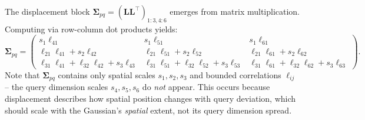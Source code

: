 \documentclass{article}
\theoremstyle{plain}
\theoremstyle{definition}
\theoremstyle{remark}
\begin{document}

The displacement block $\boldsymbol{\Sigma}_{pq} = (\mathbf{L}\mathbf{L}^\top)_{1:3,4:6}$ emerges from matrix multiplication. Computing via row-column dot products yields:
\begin{equation}
\boldsymbol{\Sigma}_{pq} = \left(\begin{array}{rrr}
                           s_1 \ell_{41} &                            s_1 \ell_{51} &                            s_1 \ell_{61} \\
     \ell_{21}\ell_{41} + s_2 \ell_{42} &      \ell_{21}\ell_{51} + s_2 \ell_{52} &      \ell_{21}\ell_{61} + s_2 \ell_{62} \\
\ell_{31}\ell_{41} + \ell_{32}\ell_{42} + s_3 \ell_{43} & \ell_{31}\ell_{51} + \ell_{32}\ell_{52} + s_3 \ell_{53} & \ell_{31}\ell_{61} + \ell_{32}\ell_{62} + s_3 \ell_{63}
\end{array}\right).
\end{equation}
Note that $\boldsymbol{\Sigma}_{pq}$ contains only spatial scales $s_1, s_2, s_3$ and bounded correlations $\ell_{ij}$ -- the query dimension scales $s_4, s_5, s_6$ do \textit{not} appear. This occurs because displacement describes how spatial position changes with query deviation, which should scale with the Gaussian's \textit{spatial} extent, not its query dimension spread.
\end{document}
